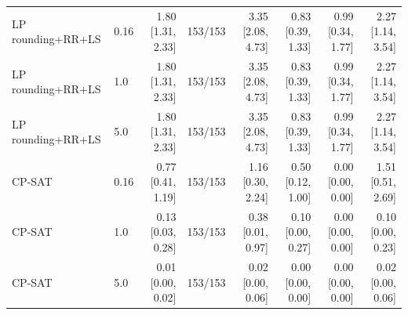 \begin{table}[t]
\begin{tabular}{llrrrrrr}
LP rounding+RR+LS & 0.16 & 1.80 [1.31, 2.33] & 153/153 & 3.35 [2.08, 4.73] & 0.83 [0.39, 1.33] & 0.99 [0.34, 1.77] & 2.27 [1.14, 3.54] \\
LP rounding+RR+LS & 1.0 & 1.80 [1.31, 2.33] & 153/153 & 3.35 [2.08, 4.73] & 0.83 [0.39, 1.33] & 0.99 [0.34, 1.77] & 2.27 [1.14, 3.54] \\
LP rounding+RR+LS & 5.0 & 1.80 [1.31, 2.33] & 153/153 & 3.35 [2.08, 4.73] & 0.83 [0.39, 1.33] & 0.99 [0.34, 1.77] & 2.27 [1.14, 3.54] \\
CP-SAT & 0.16 & 0.77 [0.41, 1.19] & 153/153 & 1.16 [0.30, 2.24] & 0.50 [0.12, 1.00] & 0.00 [0.00, 0.00] & 1.51 [0.51, 2.69] \\
CP-SAT & 1.0 & 0.13 [0.03, 0.28] & 153/153 & 0.38 [0.01, 0.97] & 0.10 [0.00, 0.27] & 0.00 [0.00, 0.00] & 0.10 [0.00, 0.23] \\
CP-SAT & 5.0 & 0.01 [0.00, 0.02] & 153/153 & 0.02 [0.00, 0.06] & 0.00 [0.00, 0.00] & 0.00 [0.00, 0.00] & 0.02 [0.00, 0.06] \\
\bottomrule
\end{tabular}
\end{table}
